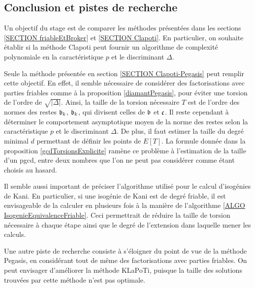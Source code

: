 \subsection{Conclusion et pistes de recherche}


Un objectif du stage est de comparer les méthodes présentées dans les sections \ref{SECTION friableEtBroker} et \ref{SECTION Clapoti}. En particulier, on souhaite établir si la méthode Clapoti peut fournir un algorithme de complexité polynomiale en la caractéristique $p$ et le discriminant $\Delta$.  

Seule la méthode présentée en section \ref{SECTION Clapoti-Pegasis} peut remplir cette objectif. En effet, il semble nécessaire de considérer des factorisations avec parties friables comme à la proposition \ref{diamantPegasis}, pour éviter une torsion de l'ordre de $\sqrt{|\Delta|}$. Ainsi, la taille de la torsion nécessaire $T$ est de l'ordre des normes des restes $\mathfrak{b}_k$, $\mathfrak{b}_k$, qui divisent celles de $\mathfrak{b}$ et $\mathfrak{c}$. Il reste cependant à déterminer le comportement asymptotique moyen de la norme des restes selon la caractéristique $p$ et le discriminant $\Delta$. De plus, il faut estimer la taille du degré minimal $d$ permettant de définir les points de $E[T]$. La formule donnée dans la proposition \ref{gcdTorsionsExplicite} ramène ce problème à l'estimation de la taille d'un pgcd, entre deux nombres que l'on ne peut pas considérer comme étant choisis au hasard. 

Il semble aussi important de préciser l'algorithme utilisé pour le calcul d'isogénies de Kani. En particulier, si une isogénie de Kani est de degré friable, il est envisageable de la calculer en plusieurs fois à la manière de l'algorithme \ref{ALGO IsogenieEquivalenceFriable}. Ceci permettrait de réduire la taille de torsion nécessaire à chaque étape ainsi que le degré de l'extension dans laquelle mener les calculs. 

Une autre piste de recherche consiste à s'éloigner du point de vue de la méthode Pegasis, en considérant tout de même des factorisations avec parties friables. On peut envisager d'améliorer la méthode KLaPoTi, puisque la taille des solutions trouvées par cette méthode n'est pas optimale. 


